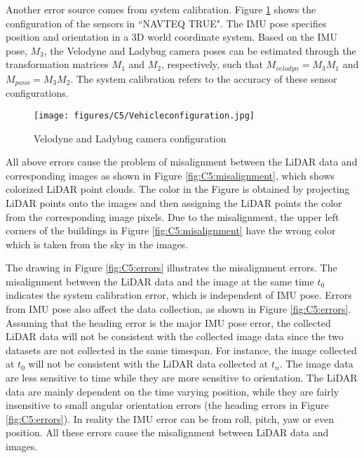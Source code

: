 Another error source comes from system calibration.  Figure \ref{fig:C5:Configuration} shows the configuration of the sensors in ``NAVTEQ TRUE". The IMU pose specifies position and orientation in a 3D world coordinate system. Based on the IMU pose, $M_3$, the Velodyne and Ladybug camera poses can be estimated through the transformation matrices $M_1$ and $M_2$, respectively, such that $M_{velodyn} = M_3M_1$ and $M_{pano} = M_3M_2$. The system calibration refers to the accuracy of these sensor configurations. 

\begin{figure}[H]
\centering
\texttt{[image: figures/C5/Vehicleconfiguration.jpg]} \\
\caption{Velodyne and Ladybug camera configuration}
\label{fig:C5:Configuration}
\end{figure}

All above errors cause the problem of misalignment between the LiDAR data and corresponding images as shown in Figure \ref{fig:C5:misalignment}, which shows colorized LiDAR point clouds. The color in the Figure is obtained by projecting LiDAR points onto the images and then assigning the LiDAR points the color from the corresponding image pixels. Due to the misalignment, the upper left corners of the buildings in Figure \ref{fig:C5:misalignment} have the wrong color which is taken from the sky in the images. 

The drawing in Figure \ref{fig:C5:errors} illustrates the misalignment errors. The misalignment between the LiDAR data and the image at the same time $t_0$ indicates the system calibration error, which is independent of IMU pose. Errors from IMU pose also affect the data collection, as shown in Figure \ref{fig:C5:errors}. Assuming that the heading error is the major IMU pose error, the collected LiDAR data will not be consistent with the collected image data since the two datasets are not collected in the same timespan. For instance, the image collected at $t_0$ will not be consistent with the LiDAR data collected at $t_n$. The image data are less sensitive to time while they are more sensitive to orientation. The LiDAR data are mainly dependent on the time varying position, while they are fairly insensitive to small angular orientation errors (the heading errors in  Figure \ref{fig:C5:errors}). In reality the IMU error can be from roll, pitch, yaw or even position. All these errors cause the misalignment between LiDAR data and images. 

